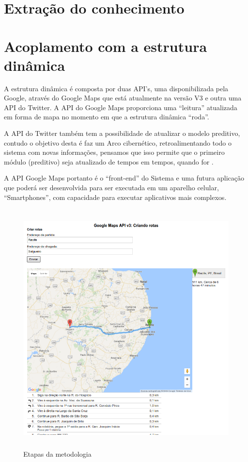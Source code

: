 \section{ Extração do conhecimento}

\pagebreak

\section{ Acoplamento com a estrutura dinâmica}

A estrutura dinâmica é composta por duas API's, uma disponibilizada pela Google, através do Google Maps que está atualmente na versão V3 e 
outra uma API do Twitter. A API do Google Maps proporciona uma ``leitura'' atualizada em forma de mapa no momento em que a estrutura dinâmica ``roda''. 

A API do Twitter também tem a possibilidade de atualizar o modelo preditivo, contudo o objetivo desta é faz um Arco cibernético, 
retroalimentando todo o sistema com novas informações, pensamos que isso permite que o primeiro módulo (preditivo) seja atualizado de 
tempos em tempos, quando for .

A API Google Maps portanto é o ``front-end'' do Sistema e uma futura aplicação que poderá ser desenvolvida para ser executada em um aparelho 
celular, ``Smartphones'', com capacidade para executar aplicativos mais complexos.


\begin{figure}[ht]
\centering
\caption{Etapas da metodologia}
\includegraphics[width=150mm, height=130mm]{Figuras/Cronograma/GoogleMaps.png}
\end{figure}
 

